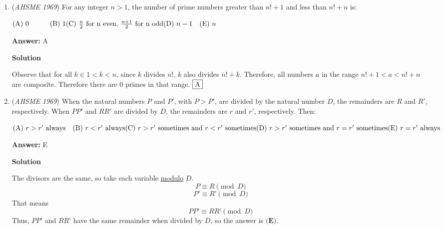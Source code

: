 \begin{enumerate}
 The shape can be divided into a triangle and a trapezoid.  For the triangle, the base is $5$ and the height is $5$, so the area is $\frac{5 \cdot 5}{2} = \frac{25}{2}$.  For the trapezoid, the two bases are $5$ and $11$ and the height is $3$, so the area is $\frac{3(5+11)}{2} = 24$.  Thus, the total area is $\frac{25}{2} + 24 = \frac{73}{2} = \boxed{\textbf{(C) } 36.5}$.

 


	\item (\textit{AHSME 1969}) For any integer $n>1$, the number of prime numbers greater than $n!+1$ and less than $n!+n$ is:


 $\text{(A) } 0\quad\qquad \text{(B) } 1\quad\\ \text{(C) } \frac{n}{2} \text{ for n even, } \frac{n+1}{2} \text{ for n odd}\quad\\ \text{(D) } n-1\quad \text{(E) } n$

 \textbf{Answer: }A



\textbf{Solution}

Observe that for all $k \in 1< k< n$, since $k$ divides $n!$, $k$ also divides $n!+k$. Therefore, all numbers $a$ in the range $n!+1<a<n!+n$ are composite. Therefore there are 0 primes in that range. $\fbox{A}$



	\item (\textit{AHSME 1969}) When the natural numbers $P$ and $P'$, with $P>P'$, are divided by the natural number $D$, the remainders are $R$ and $R'$, respectively. When $PP'$ and $RR'$ are divided by $D$, the remainders are $r$ and $r'$, respectively. Then:


 $\text{(A) } r>r' \text{  always}\quad \text{(B) } r<r' \text{  always}\quad\\ \text{(C) } r>r' \text{  sometimes and } r<r' \text{  sometimes}\quad\\ \text{(D) } r>r' \text{  sometimes and } r=r' \text{  sometimes}\quad\\ \text{(E) } r=r' \text{  always}$

 \textbf{Answer: }E



\textbf{Solution}

The divisors are the same, so take each variable \href{https://artofproblemsolving.com/wiki/index.php?title=Modulo}{modulo} $D$.
 \[P \equiv R \pmod{D}\]
 \[P' \equiv R’ \pmod{D}\]That means
 \[PP’ \equiv RR’ \pmod{D}\]Thus, $PP’$ and $RR’$ have the same remainder when divided by $D$, so the answer is $\boxed{\textbf{(E)}}$.


\end{enumerate}
